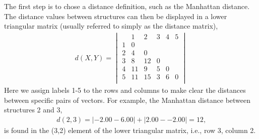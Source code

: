 The  first  step  is to  chose  a  distance  definition, such  as  the
Manhattan distance.   The distance values between  structures can then
be displayed in a lower  triangular matrix (usually referred to simply
as the distance matrix),
\begin{gather} 
d(X, Y)=
\begin{vmatrix}
   & 1  &  2   & 3 & 4 & 5 \\
1  & 0  &      &   &   &   \\
2  & 4  &  0   &   &   &   \\
3  & 8  & 12   & 0 &   &   \\
4  & 11 &  9   & 5 & 0 &   \\
5  & 11 & 15   & 3 & 6 & 0 \\
\end{vmatrix}
\label{eq:man}
\end{gather}
Here we  assign labels 1-5 to the  rows and columns to  make clear the
distances  between  specific  pairs   of  vectors.  For  example,  the
Manhattan distance between structures 2 and 3,
\begin{gather}
d(2, 3)= |-2.00 - 6.00| + |2.00 - -2.00| = 12 \text{,}
\end{gather}
is found  in the (3,2) element  of the lower  triangular matrix, i.e.,
row 3, column 2.

